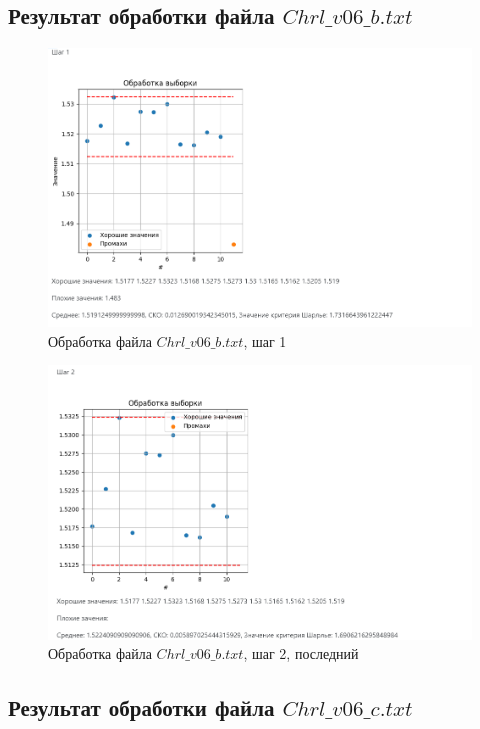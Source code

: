 \documentclass[a4paper,14pt]{article}
\begin{document}
	\subsection{Результат обработки файла $Chrl\_v06\_b.txt$}
	
	\begin{figure}[H]
		\centering
		\includegraphics[width=0.95\linewidth]{images/b_1}
		\caption{Обработка файла $Chrl\_v06\_b.txt$, шаг 1}
		\label{fig:b_1}
	\end{figure}
	
	
	\begin{figure}[H]
		\centering
		\includegraphics[width=0.95\linewidth]{images/b_2}
		\caption{Обработка файла $Chrl\_v06\_b.txt$, шаг 2, последний}
		\label{fig:b_2}
	\end{figure}
	
	\subsection{Результат обработки файла $Chrl\_v06\_c.txt$}
	
\end{document}
